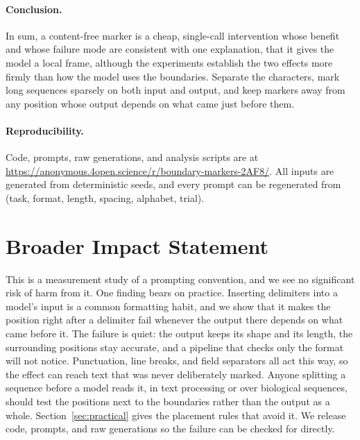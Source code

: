 \documentclass[10pt]{article} %
\begin{document}
\paragraph{Conclusion.} In sum, a content-free marker is a cheap, single-call intervention whose benefit and whose failure mode are consistent with one explanation, that it gives the model a local frame, although the experiments establish the two effects more firmly than how the model uses the boundaries. Separate the characters, mark long sequences sparsely on both input and output, and keep markers away from any position whose output depends on what came just before them.

\paragraph{Reproducibility.} Code, prompts, raw generations, and analysis scripts are at \url{https://anonymous.4open.science/r/boundary-markers-2AF8/}. All inputs are generated from deterministic seeds, and every prompt can be regenerated from (task, format, length, spacing, alphabet, trial).

\section*{Broader Impact Statement}

This is a measurement study of a prompting convention, and we see no significant risk of harm from it. One finding bears on practice. Inserting delimiters into a model's input is a common formatting habit, and we show that it makes the position right after a delimiter fail whenever the output there depends on what came before it. The failure is quiet: the output keeps its shape and its length, the surrounding positions stay accurate, and a pipeline that checks only the format will not notice. Punctuation, line breaks, and field separators all act this way, so the effect can reach text that was never deliberately marked. Anyone splitting a sequence before a model reads it, in text processing or over biological sequences, should test the positions next to the boundaries rather than the output as a whole. Section~\ref{sec:practical} gives the placement rules that avoid it. We release code, prompts, and raw generations so the failure can be checked for directly.

\FloatBarrier



\appendix
\end{document}

